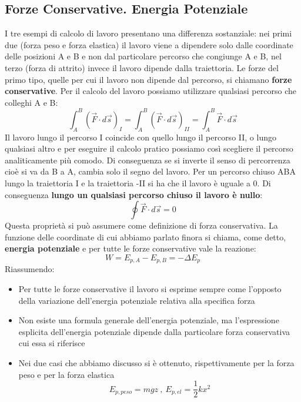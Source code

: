 \documentclass{article}
\numberwithin{equation}{subsection}
\begin{document}
\subsection{Forze Conservative. Energia Potenziale}
I tre esempi di calcolo di lavoro presentano una differenza sostanziale: nei primi due (forza peso e forza elastica) il lavoro viene a dipendere solo dalle coordinate delle posizioni A e B e non dal particolare percorso che congiunge A e B, nel terzo (forza di attrito) invece il lavoro dipende dalla traiettoria. Le forze del primo tipo, quelle per cui il lavoro non dipende dal percorso, si chiamano \textbf{forze conservative}. Per il calcolo del lavoro possiamo utilizzare qualsiasi percorso che colleghi A e B:
\begin{equation}
    \int_A^B (\vec{F} \cdot d\vec{s})_I=\int_A^B(\vec{F} \cdot d\vec{s})_{II}= \int_A^B \vec{F} \cdot d\vec{s}
\end{equation}
Il lavoro lungo il percorso I coincide con quello lungo il percorso II, o lungo qualsiasi altro e per eseguire il calcolo pratico possiamo così scegliere il percorso analiticamente più comodo. Di conseguenza se si inverte il senso di percorrenza cioè si va da B a A, cambia solo il segno del lavoro. Per un percorso chiuso ABA lungo la traiettoria I e la traiettoria -II si ha che il lavoro è uguale a 0. Di conseguenza \textbf{lungo un qualsiasi percorso chiuso il lavoro è nullo}:
\begin{equation}
    \oint\vec{F}\cdot d\vec{s} = 0
\end{equation}
Questa proprietà si può assumere come definizione di forza conservativa. La funzione delle coordinate di cui abbiamo parlato finora si chiama, come detto, \textbf{energia potenziale} e per tutte le forze conservative vale la reazione:
\begin{equation}
    W=E_{p,A}-E_{p, B}= -\Delta E_p
\end{equation}
Riassumendo:
\begin{itemize}
    \item Per tutte le forze conservative il lavoro si esprime sempre come l'opposto della variazione dell'energia potenziale relativa alla specifica forza
    \item Non esiste una formula generale dell'energia potenziale, ma l'espressione esplicita dell'energia potenziale dipende dalla particolare forza conservativa cui essa si riferisce
    \item Nei due casi che abbiamo discusso si è ottenuto, rispettivamente per la forza peso e per la forza elastica
    \begin{equation}
        E_{p,peso}=mgz \ , \ E_{p,el}=\frac{1}{2}kx^2
    \end{equation}
\end{itemize}
\end{document}
